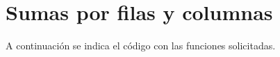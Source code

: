 \section{Sumas por filas y columnas}

  A continuación se indica el código con las funciones
  solicitadas.
  
    